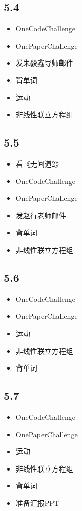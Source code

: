 \documentclass[UTF8]{ctexart}
\begin{document}
\subsection*{5.4}
\begin{itemize}
    \item OneCodeChallenge
    \item OnePaperChallenge
    \item 发朱毅鑫导师邮件
    \item 背单词
    \item 运动
    \item 非线性联立方程组
\end{itemize}

\subsection*{5.5}
\begin{itemize}
    \item 看《无间道2》
    \item OneCodeChallenge
    \item OnePaperChallenge
    \item 发赵行老师邮件
    \item 背单词
    \item 非线性联立方程组
\end{itemize}

\subsection*{5.6}
\begin{itemize}
    \item OneCodeChallenge
    \item OnePaperChallenge
    \item 运动
    \item 非线性联立方程组
    \item 背单词
\end{itemize}

\subsection*{5.7}
\begin{itemize}
    \item OneCodeChallenge
    \item OnePaperChallenge
    \item 运动
    \item 非线性联立方程组
    \item 背单词
    \item 准备汇报PPT
\end{itemize}
\end{document}
